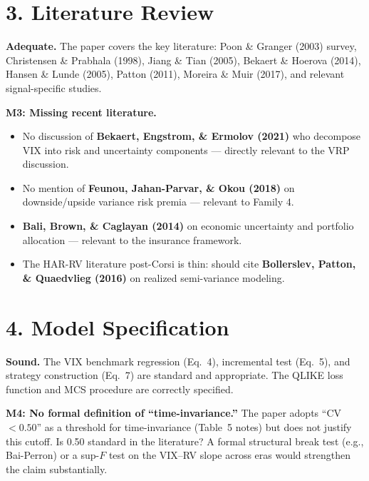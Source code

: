 \documentclass[12pt,a4paper]{article}
\begin{document}
\section*{3. Literature Review}

\textcolor{okgreen}{\textbf{Adequate.}} The paper covers the key literature: Poon \& Granger (2003) survey, Christensen \& Prabhala (1998), Jiang \& Tian (2005), Bekaert \& Hoerova (2014), Hansen \& Lunde (2005), Patton (2011), Moreira \& Muir (2017), and relevant signal-specific studies.

\textcolor{warncolor}{\textbf{M3: Missing recent literature.}}
\begin{itemize}
\item No discussion of \textbf{Bekaert, Engstrom, \& Ermolov (2021)} who decompose VIX into risk and uncertainty components --- directly relevant to the VRP discussion.
\item No mention of \textbf{Feunou, Jahan-Parvar, \& Okou (2018)} on downside/upside variance risk premia --- relevant to Family 4.
\item \textbf{Bali, Brown, \& Caglayan (2014)} on economic uncertainty and portfolio allocation --- relevant to the insurance framework.
\item The HAR-RV literature post-Corsi is thin: should cite \textbf{Bollerslev, Patton, \& Quaedvlieg (2016)} on realized semi-variance modeling.
\end{itemize}

\section*{4. Model Specification}

\textcolor{okgreen}{\textbf{Sound.}} The VIX benchmark regression (Eq.~4), incremental test (Eq.~5), and strategy construction (Eq.~7) are standard and appropriate. The QLIKE loss function and MCS procedure are correctly specified.

\textcolor{warncolor}{\textbf{M4: No formal definition of ``time-invariance.''}}
The paper adopts ``CV $< 0.50$'' as a threshold for time-invariance (Table~5 notes) but does not justify this cutoff. Is 0.50 standard in the literature? A formal structural break test (e.g., Bai-Perron) or a sup-$F$ test on the VIX--RV slope across eras would strengthen the claim substantially.
\end{document}
